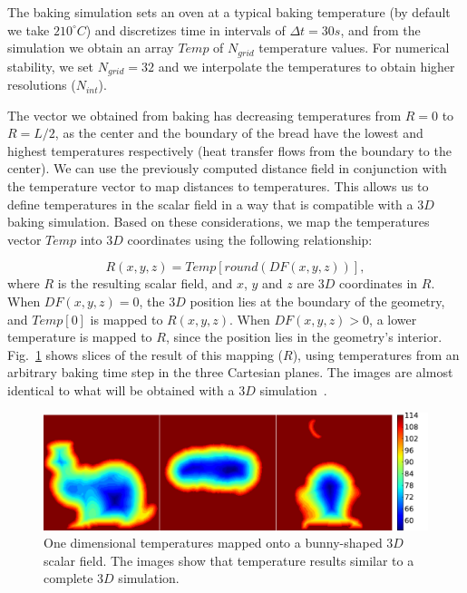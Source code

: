 \documentclass[spanish,a4paper,11pt,oneside,links]{report}
\begin{document}
The baking simulation sets an oven at a typical baking temperature (by default we take $210^{\circ}C$) and discretizes time in intervals of $\Delta t = 30s$, and from the simulation we obtain an array $Temp$ of $N_{grid}$ temperature values. 
For numerical stability, we set $N_{grid}=32$ and we interpolate the temperatures to obtain higher resolutions ($N_{int}$). 

The vector we obtained from baking has decreasing temperatures from $R = 0$ to $R = L/2$, as the center and the boundary of the bread have the lowest and highest temperatures respectively (heat transfer flows from the boundary to the center). 
We can use the previously computed distance field in conjunction with the temperature vector to map distances to temperatures. 
This allows us to define temperatures in the scalar field in a way that is compatible with a $3D$ baking simulation. Based on these considerations, we map the temperatures vector $Temp$ into $3D$ coordinates using the following relationship:

\begin{equation*}
\displaystyle R(x,y,z) = Temp[ round( DF(x,y,z) ) ], 
\end{equation*}
%
where $R$ is the resulting scalar field, and $x$, $y$ and $z$ are $3D$ coordinates in $R$. When $DF(x,y,z) = 0$, the $3D$ position lies at the boundary of the geometry, and $Temp[0]$ is mapped to $R(x,y,z)$. 
When $DF(x,y,z) > 0$, a lower temperature is mapped to $R$, since the position lies in the geometry's interior. 
Fig.~\ref{fg:baking} shows slices of the result of this mapping ($R$), using temperatures from an arbitrary baking time step in the three Cartesian planes. 
The images are almost identical to what will be obtained with a $3D$ simulation~\cite{Purlis2010}.

\begin{figure}
\includegraphics[width=15cm]{figures/tempsbunny}
\caption{One dimensional temperatures mapped onto a bunny-shaped $3D$ scalar field. The images show that temperature results similar to a complete $3D$ simulation.}
\label{fg:baking}
\end{figure}
\end{document}
